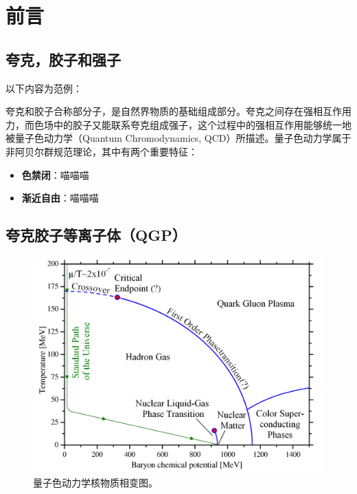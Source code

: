 %
%
%
%

\chapter{前言}	
\section{夸克，胶子和强子}

以下内容为范例：

夸克和胶子合称部分子，是自然界物质的基础组成部分。夸克之间存在强相互作用力，而色场中的胶子又能联系夸克组成强子，这个过程中的强相互作用能够统一地被量子色动力学（Quantum Chromodynamics, QCD）\parencite{Han:1965pf}所描述。量子色动力学属于非阿贝尔群规范理论\parencite{Gross1973UltravioletBO}，其中有两个重要特征：

\begin{itemize}
	\item \textbf{色禁闭\parencite{GellMann:1964nj,Zweig:1964jf}}：喵喵喵
	\item \textbf{渐近自由}：喵喵喵
\end{itemize}

\section{夸克胶子等离子体（QGP）}

\begin{figure}[htb]
	\centering
	\includegraphics[width=0.7\linewidth]{../figures/1-thesis.png}
	\caption{量子色动力学核物质相变图。~\parencite{Boeckel:2011yj}}
	\label{fig:1-thesis}
\end{figure}

